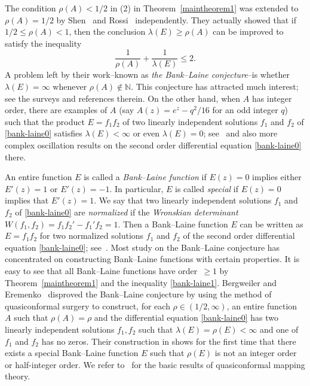 \documentclass[12pt]{amsart}
\numberwithin{equation}{section}
\begin{document}
The condition $\rho(A)<1/2$ in (2) in Theorem~\ref{maintheorem1} was extended to $\rho(A)=1/2$ by Shen~\cite{Shen1985} and Rossi~\cite{Rossi1986} independently. They actually showed that if $1/2\leq \rho(A)<1$, then the conclusion $\lambda(E) \geq \rho(A)$ can be improved to satisfy the inequality
\begin{equation}\label{bank-laine1}
\frac{1}{\rho(A)}+\frac{1}{\lambda(E)}\leq 2.
\end{equation}
A problem left by their work--known as \emph{the Bank--Laine conjecture}--is whether $\lambda(E)=\infty$ whenever $\rho(A)\not\in \mathbb{N}$. This conjecture has attracted much interest; see the surveys \cite{Gundersen2014,lainetohge2008} and references therein. On the other hand, when $A$ has integer order, there are examples of $A$ (say $A(z)=e^z-q^2/16$ for an odd integer $q$) such that the product $E=f_1f_2$ of two linearly independent solutions $f_1$ and $f_2$ of \eqref{bank-laine0} satisfies $\lambda(E)<\infty$ or even $\lambda(E)=0$; see~\cite[Theorem~5.22]{Laine1993} and also more complex oscillation results on the second order differential equation \eqref{bank-laine0} there.

An entire function $E$ is called a \emph{Bank--Laine function} if $E(z)=0$ implies either $E'(z)=1$ or $E'(z)=-1$. In particular, $E$ is called \emph{special} if $E(z)=0$ implies that $E'(z)=1$. We say that two linearly independent solutions $f_1$ and $f_2$ of \eqref{bank-laine0} are \emph{normalized} if the \emph{Wronskian determinant}~$W(f_1,f_2)=f_1f_2'-f_1'f_2=1$. Then a Bank--Laine function $E$ can be written as $E=f_1f_2$ for two normalized solutions $f_1$ and $f_2$ of the second order differential equation \eqref{bank-laine0}; see~\cite[Proposition~6.4]{Laine1993}. Most study on the Bank--Laine conjecture has concentrated on constructing Bank--Laine functions with certain properties. It is easy to see that all Bank--Laine functions have order~$\geq1$ by Theorem~\ref{maintheorem1} and the inequality \eqref{bank-laine1}. Bergweiler and Eremenko~\cite{Bergweilereremenko2017,Bergweilereremenko2019} disproved the Bank--Laine conjecture by using the method of quasiconformal surgery to construct, for each $\rho\in(1/2,\infty)$, an entire function $A$ such that $\rho(A)=\rho$ and the differential equation \eqref{bank-laine0} has two linearly independent solutions $f_1,f_2$ such that $\lambda(E)=\rho(E)<\infty$ and one of $f_1$ and $f_2$ has no zeros. Their construction in \cite{Bergweilereremenko2017} shows for the first time that there exists a special Bank--Laine function $E$ such that $\rho(E)$ is not an integer order or half-integer order. We refer to~\cite{Ahlfors2006,lehtoVirtanen2008} for the basic results of quasiconformal mapping theory.
\end{document}
